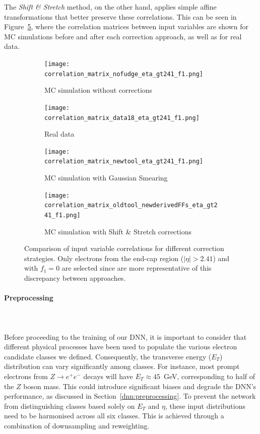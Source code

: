 The \textit{Shift \& Stretch} method, on the other hand, applies simple affine transformations that better preserve these correlations. This can be seen in Figure~\ref{fig:correlations}, where the correlation matrices between input variables are shown for MC simulations before and after each correction approach, as well as for real data.

\begin{figure}[htbp]
  \centering
  \begin{subfigure}[b]{0.45\textwidth}
      \centering
      \texttt{[image: correlation\_matrix\_nofudge\_eta\_gt241\_f1.png]}
      \caption{MC simulation without corrections}
      \label{fig:corr_nominal}
  \end{subfigure}
  \hfill
  \begin{subfigure}[b]{0.45\textwidth}
      \centering
      \texttt{[image: correlation\_matrix\_data18\_eta\_gt241\_f1.png]}
      \caption{Real data}
      \label{fig:corr_data}
  \end{subfigure}
  \vspace{0.4cm}
  \begin{subfigure}[b]{0.45\textwidth}
      \centering
      \texttt{[image: correlation\_matrix\_newtool\_eta\_gt241\_f1.png]}
      \caption{MC simulation with Gaussian Smearing}
      \label{fig:corr_smearing}
  \end{subfigure}
  \hfill
  \begin{subfigure}[b]{0.45\textwidth}
      \centering
      \texttt{[image: correlation\_matrix\_oldtool\_newderivedFFs\_eta\_gt241\_f1.png]}
      \caption{MC simulation with Shift \& Stretch corrections}
      \label{fig:corr_shiftstretch}
  \end{subfigure}
  \caption{Comparison of input variable correlations for different correction strategies. Only electrons from the end-cap region ($|\eta|>2.41$) and with $f_{1}=0$ are selected since are more representative of this discrepancy between approaches.}
  \label{fig:correlations}
\end{figure}

\paragraph{Preprocessing} \mbox{}\\
\\
Before proceeding to the training of our DNN, it is important to consider that different physical processes have been used to populate the various electron candidate classes we defined. Consequently, the transverse energy ($E_{T}$) distribution can vary significantly among classes. For instance, most prompt electrons from $Z \to e^{+}e^{-}$ decays will have $E_{T} \approx 45$~GeV, corresponding to half of the $Z$ boson mass. This could introduce significant biases and degrade the DNN’s performance, as discussed in Section~\ref{dnn:preprocessing}.
To prevent the network from distinguishing classes based solely on $E_{T}$ and $\eta$, these input distributions need to be harmonised across all six classes. This is achieved through a combination of downsampling and reweighting.

